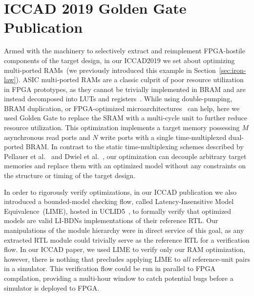\section{ICCAD 2019 Golden Gate Publication}

Armed with the machinery to selectively extract and reimplement FPGA-hostile
components of the target design, in our ICCAD2019 we set about optimizing
multi-ported RAMs~(we previously introduced this example in
Section~\ref{sec:iron-law}).  ASIC multi-ported RAMs are a classic culprit of
poor resource utilization in FPGA prototypes, as they cannot be trivially
implemented in BRAM and are instead decomposed into LUTs and
registers~\cite{FPGAGap2}.  While using double-pumping, BRAM duplication, or
FPGA-optimized microarchitectures~\cite{MultiportXOR} can help, here we used Golden Gate to
replace the SRAM with a multi-cycle unit to further reduce resource
utilization. This optimization implements a target memory possessing $M$ asynchronous read ports and
$N$ write ports with a single time-multiplexed dual-ported BRAM. In contrast to the static time-multiplexing schemes described
by Pellauer et al.~\cite{APortNetworks} and Dwiel et al.~\cite{fabscalarfpga}, our optimization can decouple arbitrary target
memories and replace them with an optimized model without any constraints on the structure or timing of the
target design.

In order to rigorously verify optimizations, in our ICCAD publication we also
introduced a bounded-model checking flow, called Latency-Insensitive Model
Equivalence~(LIME), hosted in UCLID5~\cite{UCLID5}, to formally verify that
optimized models are valid LI-BDNs implementations of their reference RTL.  Our
manipulations of the module hierarchy were in direct service of this goal, as
any extracted RTL module could trivially serve as the reference RTL for a
verification flow. In our ICCAD paper, we used LIME to verify only our RAM
optimization, however, there is nothing that precludes applying LIME to
\emph{all} reference-unit pairs in a simulator. This verification flow could be
run in parallel to FPGA compilation, providing a multi-hour window to catch
potential bugs before a simulator is deployed to FPGA.

